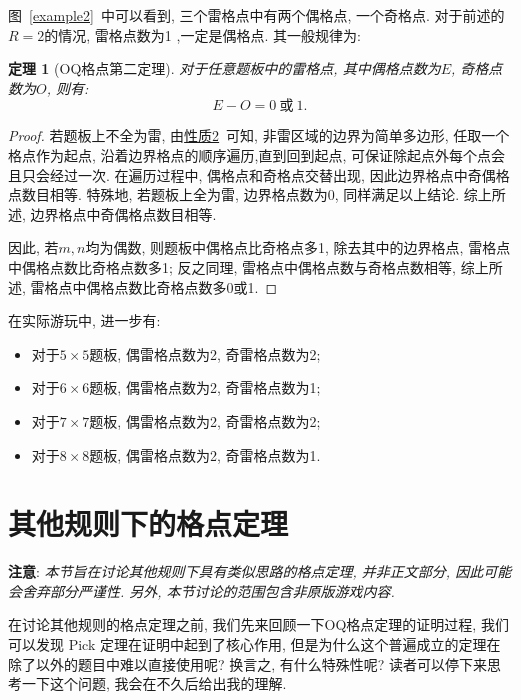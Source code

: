 \documentclass{ctexart}
\newcommand{\varible}[1]{{\Noto[#1]}}
\newtheorem{theorem}{定理}
\begin{document}
图\ \ref{example2}\ 中可以看到, 三个雷格点中有两个偶格点, 一个奇格点. 对于前述的$R = 2$的情况, 雷格点数为1 ,一定是偶格点. 其一般规律为:
\begin{theorem}[OQ格点第二定理]
    对于任意\varible{O}\varible{Q}题板中的雷格点, 其中偶格点数为$E$, 奇格点数为$O$, 则有:
    \begin{equation}
        E - O = 0\ \text{或}\ 1.
    \end{equation}    
\end{theorem}
\begin{proof}
    若题板上不全为雷, 由\hyperref[p2]{性质2}\ 可知, 非雷区域的边界为简单多边形, 任取一个格点作为起点, 沿着边界格点的顺序遍历,直到回到起点, 可保证除起点外每个点会且只会经过一次. 在遍历过程中, 偶格点和奇格点交替出现, 因此边界格点中奇偶格点数目相等. 特殊地, 若题板上全为雷, 边界格点数为0, 同样满足以上结论. 综上所述, 边界格点中奇偶格点数目相等.

    因此, 若$m,n$均为偶数, 则题板中偶格点比奇格点多1, 除去其中的边界格点, 雷格点中偶格点数比奇格点数多1; 反之同理, 雷格点中偶格点数与奇格点数相等, 综上所述, 雷格点中偶格点数比奇格点数多0或1.
\end{proof}

在实际游玩中, 进一步有:
\begin{itemize}
    \item 对于$5\times5$题板, 偶雷格点数为2, 奇雷格点数为2;
    \item 对于$6\times6$题板, 偶雷格点数为2, 奇雷格点数为1;
    \item 对于$7\times7$题板, 偶雷格点数为2, 奇雷格点数为2;
    \item 对于$8\times8$题板, 偶雷格点数为2, 奇雷格点数为1.
\end{itemize}

\section{其他规则下的格点定理}

\begin{flushleft}
    \textbf{注意}: \emph{本节旨在讨论其他规则下具有类似思路的格点定理, 并非正文部分, 因此可能会舍弃部分严谨性. 另外, 本节讨论的范围包含非原版游戏内容.}
\end{flushleft}

在讨论其他规则的格点定理之前, 我们先来回顾一下OQ格点定理的证明过程, 我们可以发现 Pick 定理在证明中起到了核心作用, 但是为什么这个普遍成立的定理在除了\varible{O}\varible{Q}以外的题目中难以直接使用呢? 换言之, \varible{O}\varible{Q} 有什么特殊性呢? 读者可以停下来思考一下这个问题, 我会在不久后给出我的理解.
\end{document}
